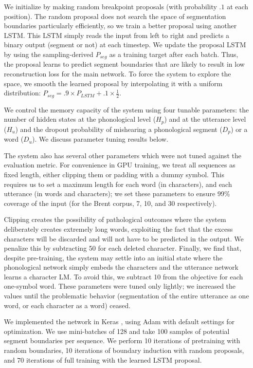 \documentclass[11pt,letterpaper]{article}
\begin{document}
We initialize by making random breakpoint proposals (with probability
$.1$ at each position). The random proposal does not search the space
of segmentation boundaries particularly efficiently, so we train a
better proposal using another LSTM. This LSTM simply reads the input
from left to right and predicts a binary output (segment or not) at
each timestep. We update the proposal LSTM by using the
sampling-derived $P_{seg}$ as a training target after each
batch. Thus, the proposal learns to predict segment boundaries that
are likely to result in low reconstruction loss for the main
network. To force the system to explore the space, we smooth the
learned proposal by interpolating it with a uniform distribution:
$P_{seg} = .9 \times P_{LSTM} + .1 \times \frac{1}{2}$.

We control the memory capacity of the system using four tunable
parameters: the number of hidden states at the phonological level
($H_p$) and at the utterance level ($H_u$) and the dropout probability
of mishearing a phonological segment ($D_p$) or a word ($D_u$). We
discuss parameter tuning results below.

The system also has several other parameters which were not tuned
against the evaluation metric. For convenience in GPU training, we
treat all sequences as fixed length, either clipping them or padding
with a dummy symbol. This requires us to set a maximum length for each
word (in characters), and each utterance (in words and characters); we
set these parameters to ensure 99\% coverage of the input (for the
Brent corpus, 7, 10, and 30 respectively).

Clipping creates the possibility of pathological outcomes where the
system deliberately creates extremely long words, exploiting the fact
that the excess characters will be discarded and will not have to be
predicted in the output. We penalize this by subtracting 50 for each
deleted character. Finally, we find that, despite pre-training, the
system may settle into an initial state where the phonological network
simply embeds the characters and the utterance network learns a
character LM. To avoid this, we subtract 10 from the objective for
each one-symbol word. These parameters were tuned only lightly; we
increased the values until the problematic behavior (segmentation of
the entire utterance as one word, or each character as a word) ceased.

We implemented the network in Keras \cite{Keras}, using Adam \cite{Kingma14}
with default settings for optimization. We use mini-batches of 128 and
take 100 samples of potential segment boundaries per sequence. We
perform 10 iterations of pretraining with random boundaries, 10
iterations of boundary induction with random proposals, and 70
iterations of full training with the learned LSTM proposal.
\end{document}

